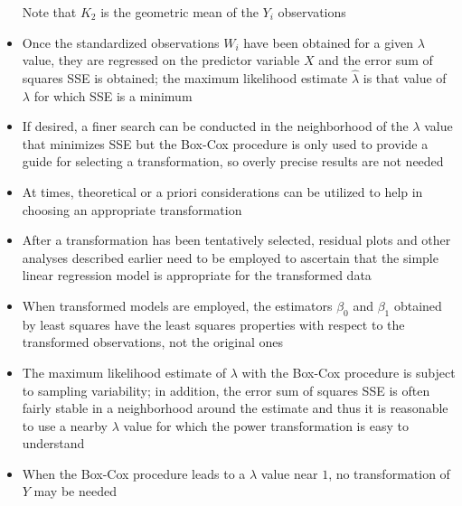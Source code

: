 \begin{itemize}
Note that $K_2$ is the geometric mean of the $Y_i$ observations
\item Once the standardized observations $W_i$ have been obtained for a given $\lambda$ value, they are regressed on the predictor variable $X$ and the error sum of squares SSE is obtained; the maximum likelihood estimate $\hat{\lambda}$ is that value of $\lambda$ for which SSE is a minimum 
\item If desired, a finer search can be conducted in the neighborhood of the $\lambda$ value that minimizes SSE but the Box-Cox procedure is only used to provide a guide for selecting a transformation, so overly precise results are not needed 
\item At times, theoretical or a priori considerations can be utilized to help in choosing an appropriate transformation 
\item After a transformation has been tentatively selected, residual plots and other analyses described earlier need to be employed to ascertain that the simple linear regression model is appropriate for the transformed data
\item When transformed models are employed, the estimators $\beta_0$ and $\beta_1$ obtained by least squares have the least squares properties with respect to the transformed observations, not the original ones
\item The maximum likelihood estimate of $\lambda$ with the Box-Cox procedure is subject to sampling variability; in addition, the error sum of squares SSE is often fairly stable in a neighborhood around the estimate and thus it is reasonable to use a nearby $\lambda$ value for which the power transformation is easy to understand 
\item When the Box-Cox procedure leads to a $\lambda$ value near $1$, no transformation of $Y$ may be needed 
\end{itemize} 

